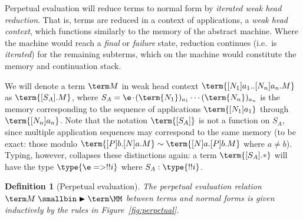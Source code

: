 \documentclass[10pt,a4paper]{amsart}
\newtheorem{definition}[theorem]{Definition}
\newcommand\msep{\kern1pt{\cdot}\kern1pt}
\newcommand\rp{\mathrel{\smallbin\blacktriangleright}}
\begin{document}
Perpetual evaluation will reduce terms to normal form by \emph{iterated weak head reduction}. That is, terms are reduced in a context of applications, a \emph{weak head context}, which functions similarly to the memory of the abstract machine. Where the machine would reach a \emph{final} or \emph{failure} state, reduction continues (i.e.\ is \emph{iterated}) for the remaining subterms, which on the machine would constitute the memory and continuation stack.

We will denote a term $\term M$ in weak head context $\term{[N_1]a_1..[N_n]a_n.M}$ as $\term{[S_A].M}$, where $S_A=\e\msep(\term{N_1})_{a_1}\cdots(\term{N_n})_{a_n}$ is the memory corresponding to the sequence of applications $\term{[N_1]a_1}$ through $\term{[N_n]a_n}$. Note that the notation $\term{[S_A]}$ is not a function on $S_A$, since multiple application sequences may correspond to the same memory (to be exact: those modulo $\term{[P]b.[N]a.M}\sim\term{[N]a.[P]b.M}$ where $a\neq b$). Typing, however, collapses these distinctions again: a term $\term{[S_A].*}$ will have the type $\type{\e => !!i}$ where $S_A:\type{!!i}$.

\begin{definition}[Perpetual evaluation]
\label{def:perpetual}
The \emph{perpetual evaluation} relation $\term M\rp\term\MM$ between terms and normal forms is given inductively by the rules in Figure~\ref{fig:perpetual}.
\end{definition}
\end{document}
